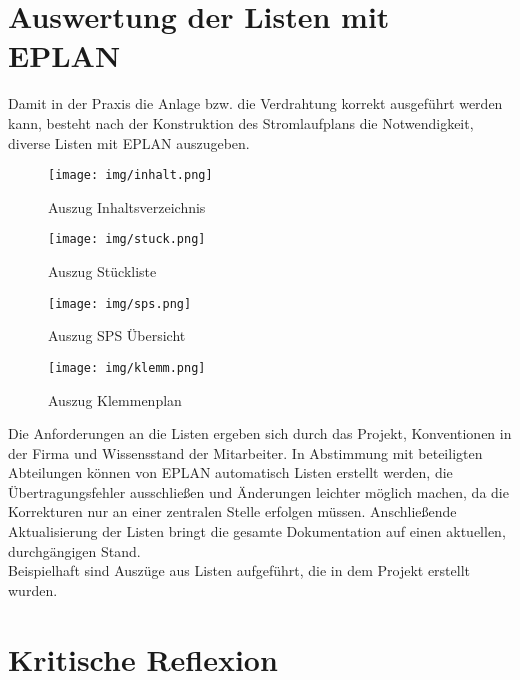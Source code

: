 \documentclass[12pt,a4paper]{scrartcl}	%
\begin{document}
\section{Auswertung der Listen mit EPLAN}

Damit in der Praxis die Anlage bzw. die Verdrahtung korrekt ausgeführt werden kann, besteht nach der Konstruktion des Stromlaufplans die Notwendigkeit, diverse Listen mit EPLAN auszugeben.
\begin{figure}
	\centering
	\texttt{[image: img/inhalt.png]}
	\caption{Auszug Inhaltsverzeichnis}
	
\end{figure}
\begin{figure}
	\centering
	\texttt{[image: img/stuck.png]}
	\caption{Auszug Stückliste}
	
\end{figure}
\begin{figure}
	\centering
	\texttt{[image: img/sps.png]}
	\caption{Auszug SPS Übersicht}
	
\end{figure}
\begin{figure}
	\centering
	\texttt{[image: img/klemm.png]}
	\caption{Auszug Klemmenplan}
	
\end{figure}
Die Anforderungen an die Listen ergeben sich durch das Projekt, Konventionen in der Firma und Wissensstand der Mitarbeiter.
In Abstimmung mit beteiligten Abteilungen können von EPLAN automatisch Listen erstellt werden, die Übertragungsfehler ausschließen und Änderungen leichter möglich machen, da die Korrekturen nur an einer zentralen Stelle erfolgen müssen. Anschließende Aktualisierung der Listen bringt die gesamte Dokumentation auf einen aktuellen, durchgängigen Stand.\\
Beispielhaft sind Auszüge aus Listen aufgeführt, die in dem Projekt erstellt wurden.
\newpage
\section{Kritische Reflexion}
\end{document}
